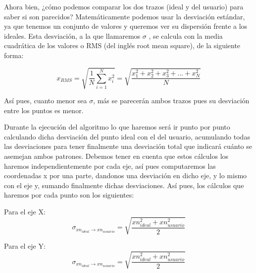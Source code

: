 \vspace{0.5cm}

Ahora bien, ¿cómo podemos comparar los dos trazos (ideal y del usuario) para saber si son parecidos? Matemáticamente podemos usar la desviación estándar, ya que tenemos un conjunto de valores y queremos ver su dispersión frente a los ideales. Esta desviación, a la que llamaremos $\sigma$ , se calcula con la media cuadrática de los valores o RMS (del inglés root mean square), de la siguiente forma:

\vspace{0.5cm}

\begin{equation}
x_{RMS} = \sqrt{\frac{1}{N}\sum_{i = 1}^{N} x_{i}^{2}}=\sqrt{\frac{x_{1}^{2} + x_{2}^{2} + x_{3}^{2} + ... + x_{N}^{2}}{N}}
\end{equation}

\vspace{0.5cm}

Así pues, cuanto menor sea $\sigma$, más se parecerán ambos trazos pues su desviación entre los puntos es menor.

\vspace{0.5cm}

Durante la ejecución del algoritmo lo que haremos será ir punto por punto calculando dicha desviación del punto ideal con el del usuario, acumulando todas las desviaciones para tener finalmente una desviación total que indicará cuánto se asemejan ambos patrones. Debemos tener en cuenta que estos cálculos los haremos independientemente por cada eje, así pues computaremos las coordenadas x por una parte, dandonos una desviación en dicho eje, y lo mismo con el eje y, sumando finalmente dichas desviaciones. Así pues, los cálculos que haremos por cada punto son los siguientes:

\vspace{0.5cm}

Para el eje X:
\begin{equation}
\sigma _{xn_{ideal}\rightarrow xn_{usuario}} = \sqrt{\frac{xn_{ideal}^{2} + xn_{usuario}^{2}}{2}}
\end{equation}

\vspace{0.5cm}

Para el eje Y:
\begin{equation}
\sigma _{xn_{ideal}\rightarrow xn_{usuario}} = \sqrt{\frac{xn_{ideal}^{2} + xn_{usuario}^{2}}{2}}
\end{equation}

